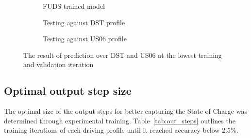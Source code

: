     \begin{figure*}[htbp]
        \centering
        \begin{subfigure}[b]{0.325\textwidth}
            \centering
            
            \caption{FUDS trained model}
            \label{subfig:FUDS_diff_prof_best}
        \end{subfigure}
        \hfill
        \begin{subfigure}[b]{0.325\textwidth}
            \centering
            
            \caption{Testing against DST profile}
            \label{subfig:DST_diff_prof_best}
        \end{subfigure}
        \hfill
        \begin{subfigure}[b]{0.325\textwidth}
            \centering
            
            \caption{Testing against US06 profile}
            \label{subfig:US_diff_prof_best}
        \end{subfigure}
        \caption{The result of prediction over DST and US06 at the lowest training and validation iteration}
        \label{fig:diff_prof_best}
    \end{figure*}
\subsection{Optimal output step size}
    The optimal size of the output steps for better capturing the State of Charge was determined through experimental training. \mbox{Table~\ref{tab:out_steps}} outlines the training iterations of each driving profile until it reached accuracy below 2.5\%.
    \begin{table}[htbp]
        \renewcommand{\arraystretch}{1.3}
        \caption{Percentage accuracy evaluation with increasing output step size}
        \centering
        \label{tab:out_steps}
    \end{table}
    
